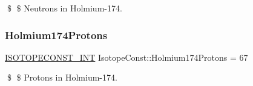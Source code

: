 \$ \$ Neutrons in Holmium-\/174. \mbox{\label{group___isotope_const-_holmium-_ho174_ga13bd37248f78b3a45be24d112c12ec43}} 
\subsubsection{\texorpdfstring{Holmium174\+Protons}{Holmium174Protons}}
{\footnotesize\ttfamily \mbox{\hyperlink{group___isotope_const-_macros_ga5f18360b3e99483a35c32d789e62621c}{I\+S\+O\+T\+O\+P\+E\+C\+O\+N\+S\+T\+\_\+\+I\+NT}} Isotope\+Const\+::\+Holmium174\+Protons = 67}

\$ \$ Protons in Holmium-\/174. 